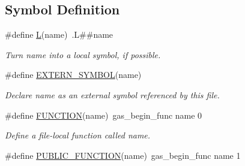 \subsection*{Symbol Definition}
\begin{DoxyCompactItemize}
\item 
\hypertarget{group__assembler__group_ga8e298c540513429b516bba4896bc2e6d}{\#define \hyperlink{group__assembler__group_ga8e298c540513429b516bba4896bc2e6d}{L}(name)~.L\#\#name}\label{group__assembler__group_ga8e298c540513429b516bba4896bc2e6d}

\begin{DoxyCompactList}\small\item\em Turn {\itshape name} into a local symbol, if possible. \end{DoxyCompactList}\item 
\hypertarget{group__assembler__group_ga4ec6c5fa246498ad62aa1fae32e0cc63}{\#define \hyperlink{group__assembler__group_ga4ec6c5fa246498ad62aa1fae32e0cc63}{E\-X\-T\-E\-R\-N\-\_\-\-S\-Y\-M\-B\-O\-L}(name)}\label{group__assembler__group_ga4ec6c5fa246498ad62aa1fae32e0cc63}

\begin{DoxyCompactList}\small\item\em Declare {\itshape name} as an external symbol referenced by this file. \end{DoxyCompactList}\item 
\hypertarget{group__assembler__group_ga4f62d0e155df806b451e332fd5a8e641}{\#define \hyperlink{group__assembler__group_ga4f62d0e155df806b451e332fd5a8e641}{F\-U\-N\-C\-T\-I\-O\-N}(name)~gas\-\_\-begin\-\_\-func name 0}\label{group__assembler__group_ga4f62d0e155df806b451e332fd5a8e641}

\begin{DoxyCompactList}\small\item\em Define a file-\/local function called {\itshape name}. \end{DoxyCompactList}\item 
\hypertarget{group__assembler__group_gae2b2aca7cb222177274d51289b51228f}{\#define \hyperlink{group__assembler__group_gae2b2aca7cb222177274d51289b51228f}{P\-U\-B\-L\-I\-C\-\_\-\-F\-U\-N\-C\-T\-I\-O\-N}(name)~gas\-\_\-begin\-\_\-func name 1}\label{group__assembler__group_gae2b2aca7cb222177274d51289b51228f}


\end{DoxyCompactItemize}
